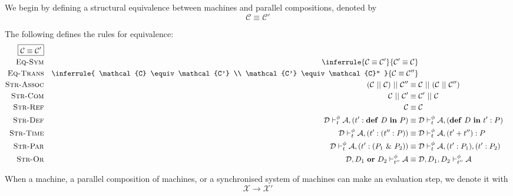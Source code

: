 We begin by defining a structural equivalence between machines and parallel
compositions, denoted by
\begin{equation*}
 \boxed{\mathcal{C} \equiv \mathcal{C}'}
\end{equation*}

The following defines the rules for equivalence:
\begin{align*}
 \boxed{\mathcal{C} \equiv \mathcal{C}'}\\
 \textsc{Eq-Sym}&&
 \inferrule
 {
    \mathcal{C} \equiv \mathcal{C}'
 }
 {
    \mathcal{C}' \equiv \mathcal{C}
 }\\
 \textsc{Eq-Trans}&&
 \inferrule
 {
    \mathcal{C} \equiv \mathcal{C'} \\ \mathcal{C'} \equiv \mathcal{C}''
 }
 {
    \mathcal{C} \equiv \mathcal{C''}
 }\\
 \textsc{Str-Assoc}&&
 (\mathcal{C} ~||~ \mathcal{C}) ~||~ \mathcal{C}''
    \equiv{}& \mathcal{C} ~||~ (\mathcal{C} ~||~ \mathcal{C}'')\\
 \textsc{Str-Com}&&
 \mathcal{C}~||~\mathcal{C}' \equiv{}& \mathcal{C}'~||~\mathcal{C}\\
 \textsc{Str-Ref}&&
 \mathcal{C} \equiv{}& \mathcal{C}\\
 \textsc{Str-Def}&&
 \mathcal{D} \vdash_{t}^\phi \mathcal{A}, (t' : \mathbf{def}~D~\mathbf{in}~P)
    \equiv{}& \mathcal{D} \vdash_{t}^\phi \mathcal{A}, (\mathbf{def}~D~\mathbf{in}~t':P) \\
 \textsc{Str-Time}&&
 \mathcal{D} \vdash_{t}^\phi \mathcal{A}, (t' : (t'' : P))
    \equiv{}& \mathcal{D} \vdash_{t}^\phi \mathcal{A}, (t'+t'') : P \\
 \textsc{Str-Par}&&
 \mathcal{D} \vdash_{t}^\phi \mathcal{A}, (t' : (P_1 ~\&~ P_2))
    \equiv{}& \mathcal{D} \vdash_{t}^\phi \mathcal{A}, (t':P_1), (t':P_2) \\
 \textsc{Str-Or}&&
 \mathcal{D}, D_1~\mathbf{or}~D_2 \vdash_{t''}^\phi \mathcal{A}
    \equiv{}& \mathcal{D}, D_1, D_2 \vdash_{t''}^\phi \mathcal{A} \\
\end{align*}

When a machine, a parallel composition of machines, or a synchronised system of
machines can make an evaluation step, we denote it with
\begin{equation*}
 \boxed{\mathcal{X} \longrightarrow \mathcal{X}'}
\end{equation*}

